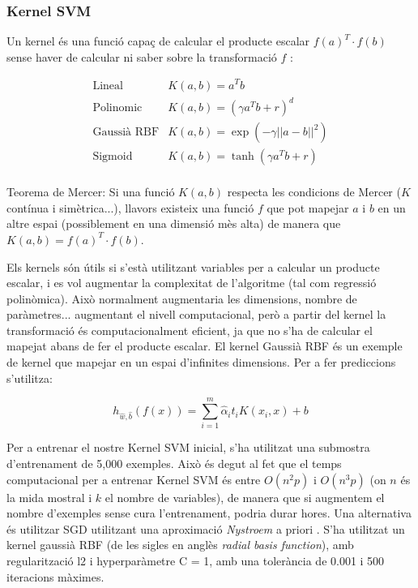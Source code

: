 \documentclass[12pt, spanish]{article}
\begin{document}
\subsubsection{Kernel SVM}

Un kernel és una funció capaç de calcular el producte escalar $f(a)^T \cdot f(b)$ sense haver de calcular ni saber sobre la transformació $f$ \cite[Cap. 5]{geron2019hands}:

\begin{equation} 
\begin{split}
\text{Lineal}          & K(a,b) = a^Tb \\
\text{Polinomic }    & K(a,b) = (\gamma a^T b + r)^d \\
\text{Gaussià RBF}& K(a,b) = \exp(-\gamma ||a - b||^2) \\
\text{Sigmoid}       & K(a,b) =  \tanh(\gamma a^Tb + r)\\
\end{split}
\end{equation}

Teorema de Mercer: Si una funció $K(a,b)$ respecta les condicions de Mercer ($K$ contínua i simètrica...), llavors existeix una funció $f$ que pot mapejar $a$ i $b$ en un altre espai (possiblement en una dimensió mès alta) de manera que $K(a,b) = f(a)^T \cdot f(b)$. 


Els kernels són útils si s'està utilitzant variables per a calcular un producte escalar, i es vol augmentar la complexitat de l'algoritme (tal com regressió polinòmica). Això normalment augmentaria les dimensions, nombre de paràmetres... augmentant el nivell computacional, però a partir del kernel la transformació és computacionalment eficient, ja que no s'ha de calcular el mapejat abans de fer el producte escalar. El kernel Gaussià RBF és un exemple de kernel que  mapejar en un espai d'infinites dimensions. Per a fer prediccions s'utilitza:

$$
h_{\hat{w}, \hat{b}}(f(x)) = \sum^m_{i = 1} \hat{\alpha}_i t_i K(x_i, x) + b
$$

Per a entrenar el nostre Kernel SVM inicial, s'ha utilitzat una submostra d'entrenament de 5,000 exemples. Això és degut al fet que el temps computacional per a entrenar Kernel SVM és entre $O(n^2 p)$  i $O(n^3 p)$ (on $n$ és la mida mostral i $k$ el nombre de variables), de manera que si augmentem el nombre d'exemples sense cura l'entrenament, podria durar hores. Una alternativa és utilitzar SGD utilitzant una aproximació \textit{Nystroem} a priori \cite{sklearn}. S'ha utilitzat un kernel gaussià RBF (de les sigles en anglès \textit{radial basis function}), amb regularització l2 i hyperparàmetre C = 1, amb una tolerància de 0.001 i 500 iteracions màximes. 
\end{document}
